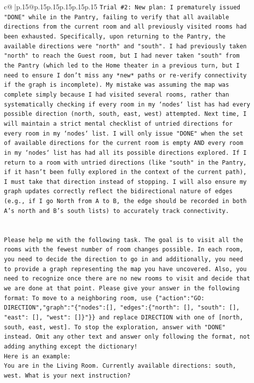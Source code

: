 \documentclass{article}
\begin{document}
{\begin{supertabular}{c@{$\;$}|p{.15\linewidth}@{}p{.15\linewidth}p{.15\linewidth}p{.15\linewidth}p{.15\linewidth}p{.15\linewidth}}
{{{\texttt{Trial \#2: New plan: I prematurely issued "DONE" while in the Pantry, failing to verify that all available directions from the current room and all previously visited rooms had been exhausted. Specifically, upon returning to the Pantry, the available directions were "north" and "south". I had previously taken "north" to reach the Guest room, but I had never taken "south" from the Pantry (which led to the Home theater in a previous turn, but I need to ensure I don't miss any *new* paths or re{-}verify connectivity if the graph is incomplete). My mistake was assuming the map was complete simply because I had visited several rooms, rather than systematically checking if every room in my `nodes` list has had every possible direction (north, south, east, west) attempted. Next time, I will maintain a strict mental checklist of untried directions for every room in my `nodes` list. I will only issue "DONE" when the set of available directions for the current room is empty AND every room in my `nodes` list has had all its possible directions explored. If I return to a room with untried directions (like "south" in the Pantry, if it hasn't been fully explored in the context of the current path), I must take that direction instead of stopping. I will also ensure my graph updates correctly reflect the bidirectional nature of edges (e.g., if I go North from A to B, the edge should be recorded in both A's north and B's south lists) to accurately track connectivity.} \\
\\ 
\\ 
\texttt{Please help me with the following task. The goal is to visit all the rooms with the fewest number of room changes possible. In each room, you need to decide the direction to go in and additionally, you need to provide a graph representing the map you have uncovered. Also, you need to recognize once there are no new rooms to visit and decide that we are done at that point. Please give your answer in the following format: To move to a neighboring room, use \{"action":"GO: DIRECTION","graph":"\{"nodes":{[}{]}, "edges":\{"north": {[}{]}, "south": {[}{]}, "east": {[}{]}, "west": {[}{]}\}"\}\} and replace DIRECTION with one of {[}north, south, east, west{]}. To stop the exploration, answer with "DONE" instead. Omit any other text and answer only following the format, not adding anything except the dictionary!} \\
\texttt{Here is an example: } \\
\texttt{You are in the Living Room. Currently available directions: south, west. What is your next instruction?} \\
}}}
\end{supertabular}}
\end{document}
